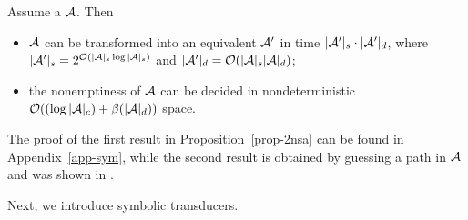 \begin{proposition}\label{prop-2nsa}
Assume a \SSA  $\mathcal{A}$. Then
\begin{itemize}
\item $\mathcal{A}$ can be  transformed into an equivalent \SA{} $\mathcal{A}'$ in time $|\mathcal{A}'|_s \cdot |\mathcal{A}'|_d$, where $|\mathcal{A}'|_s = 2^{\mathcal{O}\left(|\mathcal{A}|_s \log |\mathcal{A}|_s\right)}$ and $|\mathcal{A}'|_d = \mathcal{O}(|\mathcal{A}|_s |\mathcal{A}|_d)$;
%
%
%
\item the nonemptiness of $\mathcal{A}$ can be decided in nondeterministic $\mathcal{O}( (\log |\mathcal{A}|_c) + \beta(|\mathcal{A}|_d))$ space.
\end{itemize}
\end{proposition}
The proof of the first result in Proposition~\ref{prop-2nsa} can be found in Appendix~\ref{app-sym}, while the second result is obtained by guessing a path in $\mathcal{A}$ and was shown in \cite{NG01,DV14}.

\smallskip

Next, we introduce symbolic transducers.






